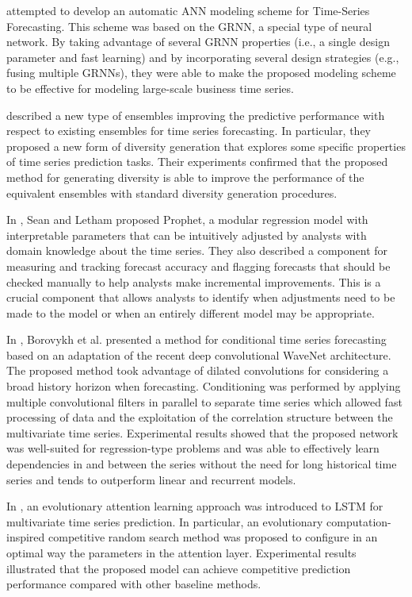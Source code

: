 \cite{6210391} attempted to develop an automatic ANN modeling scheme for Time-Series Forecasting.
This scheme was based on the GRNN, a special type of neural network.
By taking advantage of several GRNN properties (i.e., a single design parameter and fast learning) and by incorporating several design strategies (e.g., fusing multiple GRNNs), they were able to make the proposed modeling scheme to be effective for modeling large-scale business time series.

\cite{Oliveira2015} described a new type of ensembles improving the predictive performance with respect to existing ensembles for time series forecasting.
In particular, they proposed a new form of diversity generation that explores some specific properties of time series prediction tasks.
Their experiments confirmed that the proposed method for generating diversity is able to improve the performance of the equivalent ensembles with standard diversity generation procedures.

In \cite{Sean2017}, Sean and Letham proposed Prophet, a modular regression model with interpretable parameters that can be intuitively adjusted by analysts with domain knowledge about the time series.
They also described a component for measuring and tracking forecast accuracy and flagging forecasts that should be checked manually to help analysts make incremental improvements.
This is a crucial component that allows analysts to identify when adjustments need to be made to the model or when an entirely different model may be appropriate.

In \cite{Borovykh2017}, Borovykh et al. presented a method for conditional time series forecasting based on an adaptation of the recent deep convolutional WaveNet architecture.
The proposed method took advantage of dilated convolutions for considering a broad history horizon when forecasting.
Conditioning was performed by applying multiple convolutional filters in parallel to separate time series which allowed fast processing of data and the exploitation of the correlation structure between the multivariate time series.
Experimental results showed that the proposed network was well-suited for regression-type problems and was able to effectively learn dependencies in and between the series without the need for long historical time series and tends to outperform linear and recurrent models.

In \cite{LI2019104785}, an evolutionary attention learning approach was introduced to LSTM for multivariate time series prediction.
In particular, an evolutionary computation-inspired competitive random search method was proposed to configure in an optimal way the parameters in the attention layer.
Experimental results illustrated that the proposed model can achieve competitive prediction performance compared with other baseline methods.

